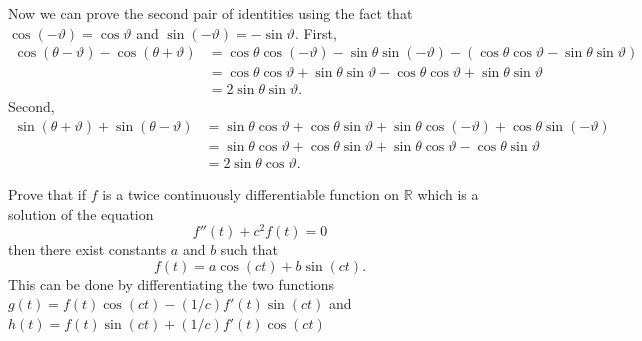 \documentclass[12 pt, letterpaper]{hmcpset}
\begin{document}
\begin{solution}
\begin{enumerate}
			Now we can prove the second pair of identities using the fact that $\cos{(-\vartheta)} = \cos{\vartheta}$ and $\sin{(-\vartheta)} = - \sin{\vartheta}$. First,
			\begin{align*}
				\cos{(\theta - \vartheta)} - \cos{(\theta + \vartheta)} & = \cos{\theta} \cos{(-\vartheta)} - \sin{\theta} \sin{(- \vartheta)} - (\cos{\theta} \cos{\vartheta} - \sin{\theta} \sin{\vartheta}) \\
											& = \cos{\theta} \cos{\vartheta} + \sin{\theta}  \sin{\vartheta} - \cos{\theta} \cos{\vartheta} + \sin{\theta}  \sin{\vartheta} \\
											& = 2 \sin{\theta} \sin{\vartheta}.
			\end{align*}
			Second,
			\begin{align*}
				\sin{(\theta + \vartheta)} + \sin{(\theta - \vartheta)} & = \sin{\theta} \cos{\vartheta} + \cos{\theta} \sin{\vartheta} + \sin{\theta} \cos{(-\vartheta)} + \cos{\theta} \sin{(- \vartheta)} \\
											& = \sin{\theta} \cos{\vartheta} + \cos{\theta} \sin{\vartheta} + \sin{\theta} \cos{\vartheta} - \cos{\theta}  \sin{\vartheta} \\
											& = 2 \sin{\theta} \cos{\vartheta}.
			\end{align*}

	\end{enumerate}
\end{solution}

\pagebreak

\begin{problem}[6.]
	Prove that if $f$ is a twice continuously differentiable function on $\mathbb{R}$ which is a solution of the equation
	\[
		f''(t) + c^{2} f(t) = 0
	\]
	then there exist constants $a$ and $b$ such that
	\[
		f(t) = a \cos{(c t)} + b \sin{(c t)}.
	\]
	This can be done by differentiating the two functions $g(t) = f(t) \cos{(c t)} - (1 / c) f'(t) \sin{(c t)}$ and $h(t) = f(t) \sin{(c t)} + (1 / c) f'(t) \cos{(ct)}$
\end{problem}
\end{document}
